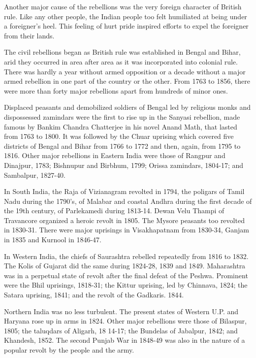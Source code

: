 Another major cause of the rebellions was the very foreign character of British rule. Like any other people, the Indian people too felt humiliated at being under a foreigner's heel. This feeling of hurt pride inspired efforts to expel the foreigner from their lands.

The civil rebellions began as British rule was established in Bengal and Bihar, arid they occurred in area after area as it was incorporated into colonial rule. There was hardly a year without armed opposition or a decade without a major armed rebellion in one part of the country or the other. From 1763 to 1856, there were more than forty major rebellions apart from hundreds of minor ones.

Displaced peasants and demobilized soldiers of Bengal led by religious monks and dispossessed zamindars were the first to rise up in the Sanyasi rebellion, made famous by Bankim Chandra Chatterjee in his novel Anand Math, that lasted from 1763 to 1800. It was followed by the Chuar uprising which covered five districts of Bengal and Bihar from 1766 to 1772 and then, again, from 1795 to 1816. Other major rebellions in Eastern India were those of Rangpur and Dinajpur, 1783; Bishnupur and Birbhum, 1799; Orissa zamindars, 1804-17; and Sambalpur, 1827-40.

In South India, the Raja of Vizianagram revolted in 1794, the poligars of Tamil Nadu during the 1790's, of Malabar and coastal Andhra during the first decade of the 19th century, of Parlekamedi during 1813-14. Dewan Velu Thampi of Travancore organized a heroic revolt in 1805. The Mysore peasants too revolted in 1830-31. There were major uprisings in Visakhapatnam from 1830-34, Ganjam in 1835 and Kurnool in 1846-47.

In Western India, the chiefs of Saurashtra rebelled repeatedly from 1816 to 1832. The Kolis of Gujarat did the same during 1824-28, 1839 and 1849. Maharashtra was in a perpetual state of revolt after the final defeat of the Peshwa. Prominent were the Bhil uprisings, 1818-31; the Kittur uprising, led by Chinnava, 1824; the Satara uprising, 1841; and the revolt of the Gadkaris. 1844.

Northern India was no less turbulent. The present states of Western U.P. and Haryana rose up in arms in 1824. Other major rebellions were those of Bilaspur, 1805; the taluqdars of Aligarh, 18 14-17; the Bundelas of Jabalpur, 1842; and Khandesh, 1852. The second Punjab War in 1848-49 was also in the nature of a popular revolt by the people and the army.

